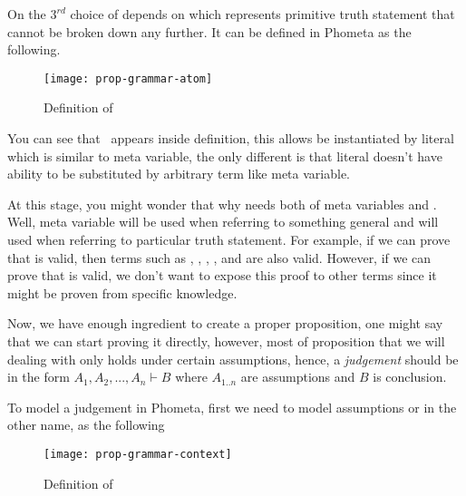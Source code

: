 \documentclass[master.tex]{subfiles}
\begin{document}
\newcommand{\propTop}[0]{\bat{\pifmt{$\top$}}}
\newcommand{\propBot}[0]{\bat{\pifmt{$\bot$}}}
\newcommand{\propAnd}[0]{\pifmt{$\wedge$}}
\newcommand{\propOr}[0]{\pifmt{$\vee$}}
\newcommand{\propNot}[0]{\pifmt{$\neg$}}
\newcommand{\propImp}[0]{\pifmt{$\rightarrow$}}
\newcommand{\propIff}[0]{\pifmt{$\leftrightarrow$}}

On the $3^{rd}$ choice of  depends on  which represents
primitive truth statement that cannot be broken down any further. It can be
defined in Phometa as the following.

\begin{figure}[H]
    \centering
\begin{minipage}{0.7\textwidth}
    \texttt{[image: prop-grammar-atom]}
\end{minipage}
\caption{Definition of }
\label{fig:prop-grammar-atom}
\end{figure}

You can see that \kLiteralRegex\ appears inside  definition, this
allows  be instantiated by literal which is similar to meta variable,
the only different is that literal doesn't have ability to be substituted by
arbitrary term like meta variable.

At this stage, you might wonder that why  needs both of meta
variables and . Well, meta variable will be used when referring to
something general and  will used when referring to particular truth
statement. For example, if we can prove that  is
valid, then terms such as ,
, ,
, and  are
also valid. However, if we can prove that  is
valid, we don't want to expose this proof to other terms since it might be
proven from specific knowledge.

Now, we have enough ingredient to create a proper proposition, one might say
that we can start proving it directly, however, most of proposition that we will
dealing with only holds under certain assumptions, hence, a \emph{judgement}
should be in the form $A_1, A_2, ..., A_n \vdash B$ where $A_{1..n}$ are
assumptions and $B$ is conclusion.

To model a judgement in Phometa, first we need to model assumptions or in the
other name,  as the following

\begin{figure}[H]
    \centering
\begin{minipage}{0.7\textwidth}
    \texttt{[image: prop-grammar-context]}
\end{minipage}
\caption{Definition of }
\label{fig:prop-grammar-context}
\end{figure}
\end{document}
